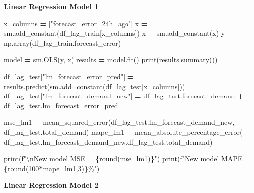 \documentclass[mstat,12pt]{unswthesis}
\newenvironment{Shaded}{\begin{snugshade}}{\end{snugshade}}
\newcommand{\BuiltInTok}[1]{#1}
\newcommand{\CharTok}[1]{\textcolor[rgb]{0.31,0.60,0.02}{#1}}
\newcommand{\DecValTok}[1]{\textcolor[rgb]{0.00,0.00,0.81}{#1}}
\newcommand{\NormalTok}[1]{#1}
\newcommand{\OperatorTok}[1]{\textcolor[rgb]{0.81,0.36,0.00}{\textbf{#1}}}
\newcommand{\SpecialCharTok}[1]{\textcolor[rgb]{0.81,0.36,0.00}{\textbf{#1}}}
\newcommand{\SpecialStringTok}[1]{\textcolor[rgb]{0.31,0.60,0.02}{#1}}
\newcommand{\StringTok}[1]{\textcolor[rgb]{0.31,0.60,0.02}{#1}}
\begin{document}
\textbf{Linear Regression Model 1}

\begin{Shaded}
\begin{Highlighting}[]
\NormalTok{x\_columns }\OperatorTok{=}\NormalTok{ [}\StringTok{"forecast\_error\_24h\_ago"}\NormalTok{]}
\NormalTok{x }\OperatorTok{=}\NormalTok{ sm.add\_constant(df\_lag\_train[x\_columns])}
\NormalTok{x }\OperatorTok{=}\NormalTok{ sm.add\_constant(x)}
\NormalTok{y }\OperatorTok{=}\NormalTok{ np.array(df\_lag\_train.forecast\_error)}

\NormalTok{model }\OperatorTok{=}\NormalTok{ sm.OLS(y, x)}
\NormalTok{results }\OperatorTok{=}\NormalTok{ model.fit()}
\BuiltInTok{print}\NormalTok{(results.summary())}

\NormalTok{df\_lag\_test[}\StringTok{"lm\_forecast\_error\_pred"}\NormalTok{] }\OperatorTok{=} 
\NormalTok{    results.predict(sm.add\_constant(df\_lag\_test[x\_columns]))}
\NormalTok{df\_lag\_test[}\StringTok{"lm\_forecast\_demand\_new"}\NormalTok{] }\OperatorTok{=} 
\NormalTok{    df\_lag\_test.forecast\_demand }\OperatorTok{+}\NormalTok{ df\_lag\_test.lm\_forecast\_error\_pred}

\NormalTok{mse\_lm1 }\OperatorTok{=}\NormalTok{ mean\_squared\_error(df\_lag\_test.lm\_forecast\_demand\_new, }
\NormalTok{    df\_lag\_test.total\_demand)}
\NormalTok{mape\_lm1 }\OperatorTok{=}\NormalTok{ mean\_absolute\_percentage\_error(}
\NormalTok{  df\_lag\_test.lm\_forecast\_demand\_new,df\_lag\_test.total\_demand)}

\BuiltInTok{print}\NormalTok{(}\SpecialStringTok{f"}\CharTok{\textbackslash{}n}\SpecialStringTok{New model MSE = }\SpecialCharTok{\{}\BuiltInTok{round}\NormalTok{(mse\_lm1)}\SpecialCharTok{\}}\SpecialStringTok{"}\NormalTok{)}
\BuiltInTok{print}\NormalTok{(}\SpecialStringTok{f"New model MAPE = }\SpecialCharTok{\{}\BuiltInTok{round}\NormalTok{(}\DecValTok{100}\OperatorTok{*}\NormalTok{mape\_lm1,}\DecValTok{3}\NormalTok{)}\SpecialCharTok{\}}\SpecialStringTok{\%"}\NormalTok{)}
\end{Highlighting}
\end{Shaded}

\textbf{Linear Regression Model 2}
\end{document}
